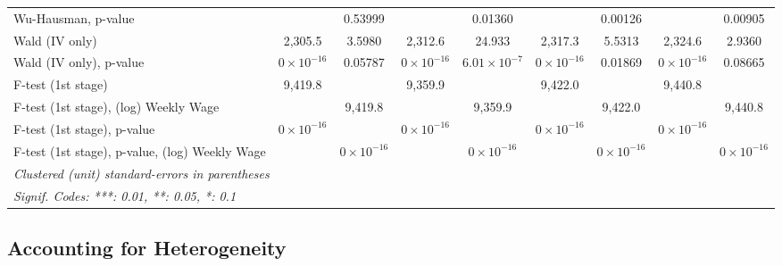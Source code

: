 \documentclass[
  10pt,
]{article}
\begin{document}
\begin{table}[htbp]
\begin{adjustbox}{max width=\linewidth}
\begin{tabular}{lcccccccc}
         Wu-Hausman, p-value                            &                     & 0.53999                 &                     & 0.01360                         &                     & 0.00126                         &                     & 0.00905\\  
         Wald (IV only)                                 & 2,305.5             & 3.5980                  & 2,312.6             & 24.933                          & 2,317.3             & 5.5313                          & 2,324.6             & 2.9360\\  
         Wald (IV only), p-value                        & $0\times 10^{-16}$  & 0.05787                 & $0\times 10^{-16}$  & $6.01\times 10^{-7}$            & $0\times 10^{-16}$  & 0.01869                         & $0\times 10^{-16}$  & 0.08665\\  
         F-test (1st stage)                             & 9,419.8             &                         & 9,359.9             &                                 & 9,422.0             &                                 & 9,440.8             & \\  
         F-test (1st stage), (log) Weekly Wage          &                     & 9,419.8                 &                     & 9,359.9                         &                     & 9,422.0                         &                     & 9,440.8\\  
         F-test (1st stage), p-value                    & $0\times 10^{-16}$  &                         & $0\times 10^{-16}$  &                                 & $0\times 10^{-16}$  &                                 & $0\times 10^{-16}$  & \\  
         F-test (1st stage), p-value, (log) Weekly Wage &                     & $0\times 10^{-16}$      &                     & $0\times 10^{-16}$              &                     & $0\times 10^{-16}$              &                     & $0\times 10^{-16}$\\   
         \midrule \midrule
         \multicolumn{9}{l}{\emph{Clustered (unit) standard-errors in parentheses}}\\
         \multicolumn{9}{l}{\emph{Signif. Codes: ***: 0.01, **: 0.05, *: 0.1}}\\
      \end{tabular}
   \end{adjustbox}
\end{table}

\FloatBarrier

\subsection{Accounting for
Heterogeneity}\label{accounting-for-heterogeneity}
\end{document}
